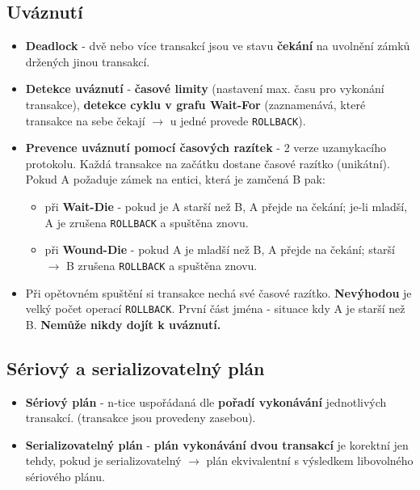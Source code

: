 \subsection{Uváznutí}
\begin{itemize}
\item \textbf{Deadlock} - dvě nebo více transakcí jsou ve stavu \textbf{čekání} na uvolnění zámků držených jinou transakcí.
\item \textbf{Detekce uváznutí} - \textbf{časové limity} (nastavení max. času pro vykonání transakce), \textbf{detekce cyklu v grafu Wait-For} (zaznamenává, které transakce na sebe čekají $\rightarrow$ u jedné provede \texttt{ROLLBACK}).
\item \textbf{Prevence uváznutí pomocí časových razítek} - 2 verze uzamykacího protokolu. Každá transakce na začátku dostane časové razítko (unikátní). Pokud A požaduje zámek na entici, která je zamčená B pak:
\begin{itemize}
\item při \textbf{Wait-Die} - pokud je A starší než B, A přejde na čekání; je-li mladší, A je zrušena \texttt{ROLLBACK} a spuštěna znovu.
\item při \textbf{Wound-Die} - pokud A je mladší než B, A přejde na čekání; starší $\rightarrow$ B zrušena \texttt{ROLLBACK} a spuštěna znovu.
\end{itemize}
\item Při opětovném spuštění si transakce nechá své časové razítko. \textbf{Nevýhodou} je velký počet operací \texttt{ROLLBACK}. První část jména - situace kdy A je starší než B. \textbf{Nemůže nikdy dojít k uváznutí.}
\end{itemize}

\subsection{Sériový a serializovatelný plán}
\begin{itemize}
\item \textbf{Sériový plán} - n-tice uspořádaná dle \textbf{pořadí vykonávání} jednotlivých transakcí. (transakce jsou provedeny zasebou).
\item \textbf{Serializovatelný plán} - \textbf{plán vykonávání dvou transakcí} je korektní jen tehdy, pokud je serializovatelný $\rightarrow$ plán ekvivalentní s výsledkem libovolného sériového plánu.
\end{itemize}


